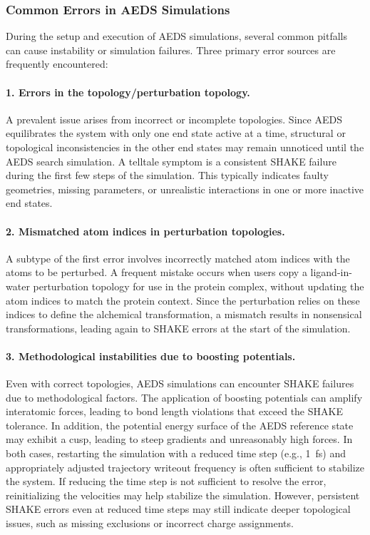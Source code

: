 \subsubsection{Common Errors in AEDS Simulations}

During the setup and execution of AEDS simulations, several common pitfalls can cause instability or simulation failures. Three primary error sources are frequently encountered:

\paragraph{1. Errors in the topology/perturbation topology.}  
A prevalent issue arises from incorrect or incomplete topologies. Since AEDS equilibrates the system with only one end state active at a time, structural or topological inconsistencies in the other end states may remain unnoticed until the AEDS search simulation. A telltale symptom is a consistent SHAKE failure during the first few steps of the simulation. This typically indicates faulty geometries, missing parameters, or unrealistic interactions in one or more inactive end states.

\paragraph{2. Mismatched atom indices in perturbation topologies.}  
A subtype of the first error involves incorrectly matched atom indices with the atoms to be perturbed. A frequent mistake occurs when users copy a ligand-in-water perturbation topology for use in the protein complex, without updating the atom indices to match the protein context. Since the perturbation relies on these indices to define the alchemical transformation, a mismatch results in nonsensical transformations, leading again to SHAKE errors at the start of the simulation.

\paragraph{3. Methodological instabilities due to boosting potentials.}  
Even with correct topologies, AEDS simulations can encounter SHAKE failures due to methodological factors. The application of boosting potentials can amplify interatomic forces, leading to bond length violations that exceed the SHAKE tolerance. In addition, the potential energy surface of the AEDS reference state may exhibit a cusp, leading to steep gradients and unreasonably high forces. In both cases, restarting the simulation with a reduced time step (e.g., 1~fs) and appropriately adjusted trajectory writeout frequency is often sufficient to stabilize the system. If reducing the time step is not sufficient to resolve the error, reinitializing the velocities may help stabilize the simulation. However, persistent SHAKE errors even at reduced time steps may still indicate deeper topological issues, such as missing exclusions or incorrect charge assignments.
